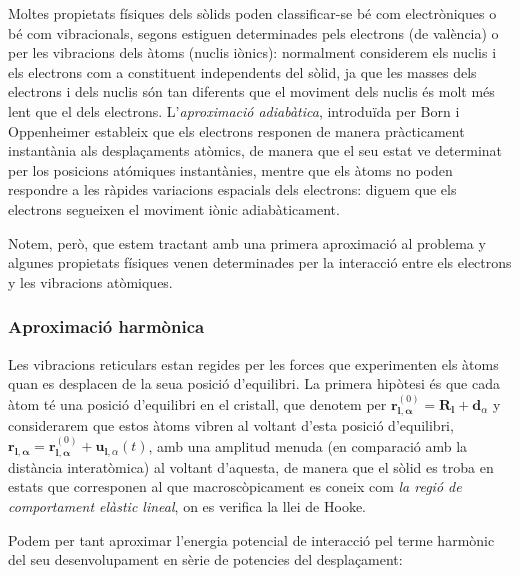 \documentclass[12pt]{article} %
\let\vec\mathbf %
\begin{document}
Moltes propietats físiques dels sòlids poden classificar-se bé com electròniques o bé com vibracionals, segons estiguen determinades pels electrons (de valència) o per les vibracions dels àtoms (nuclis iònics): normalment considerem els nuclis i els electrons com a constituent independents del sòlid, ja que les masses dels electrons i dels nuclis són tan diferents que el moviment dels nuclis és molt més lent que el dels electrons. L'\emph{aproximació adiabàtica}, introduïda per Born i Oppenheimer \cite{ANDP:ANDP19273892002} estableix que els electrons responen de manera pràcticament instantània als desplaçaments atòmics, de manera que el seu estat ve determinat per los posicions atómiques instantànies, mentre que els àtoms no poden respondre a les ràpides variacions espacials dels electrons: diguem que els electrons segueixen el moviment iònic adiabàticament.

Notem, però, que estem tractant amb una primera aproximació al problema y algunes propietats físiques venen determinades per la interacció entre els electrons y les vibracions atòmiques.



  
\subsubsection{Aproximació harmònica}

Les vibracions reticulars estan regides per les forces que experimenten els àtoms quan es desplacen de la seua posició d'equilibri. La primera hipòtesi és que cada àtom té una posició d'equilibri en el cristall, que denotem per $\vec r^{(0)}_{\vec l,\vec\alpha}=\vec R_\vec l+\vec d_\alpha$ y considerarem que estos àtoms vibren al voltant d'esta posició d'equilibri, $\vec r_{\vec l,\vec\alpha}=\vec r^{(0)}_{\vec l,\vec\alpha}+\vec u_{\vec l,\alpha}(t)$, amb una amplitud menuda (en comparació amb la distància interatòmica) al voltant d'aquesta,   de manera que el sòlid es troba en estats que corresponen al que macroscòpicament es coneix com \textit{la regió de comportament elàstic lineal}, on es verifica la llei de Hooke.

Podem per tant aproximar l'energia potencial de interacció pel terme harmònic del seu desenvolupament en sèrie de potencies del despla\c{c}ament:
\end{document}
